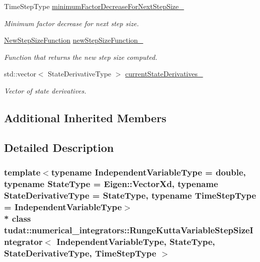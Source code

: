 \begin{DoxyCompactItemize}
Time\+Step\+Type \hyperlink{classtudat_1_1numerical__integrators_1_1RungeKuttaVariableStepSizeIntegrator_ae478abe53ab327c5a8e4f8ca978123f6}{minimum\+Factor\+Decrease\+For\+Next\+Step\+Size\+\_\+}
\begin{DoxyCompactList}\small\item\em Minimum factor decrease for next step size. \end{DoxyCompactList}\item 
\hyperlink{classtudat_1_1numerical__integrators_1_1RungeKuttaVariableStepSizeIntegrator_a7f439a647db26cafc16b08f5b2922868}{New\+Step\+Size\+Function} \hyperlink{classtudat_1_1numerical__integrators_1_1RungeKuttaVariableStepSizeIntegrator_ace984339dfb58e1ced57ab260d9992c2}{new\+Step\+Size\+Function\+\_\+}
\begin{DoxyCompactList}\small\item\em Function that returns the new step size computed. \end{DoxyCompactList}\item 
std\+::vector$<$ State\+Derivative\+Type $>$ \hyperlink{classtudat_1_1numerical__integrators_1_1RungeKuttaVariableStepSizeIntegrator_a3c76b8be3eea0bd6c4d31a8aae391030}{current\+State\+Derivatives\+\_\+}
\begin{DoxyCompactList}\small\item\em Vector of state derivatives. \end{DoxyCompactList}\end{DoxyCompactItemize}
\subsection*{Additional Inherited Members}


\subsection{Detailed Description}
\subsubsection*{template$<$typename Independent\+Variable\+Type = double, typename State\+Type = Eigen\+::\+Vector\+Xd, typename State\+Derivative\+Type = State\+Type, typename Time\+Step\+Type = Independent\+Variable\+Type$>$\\*
class tudat\+::numerical\+\_\+integrators\+::\+Runge\+Kutta\+Variable\+Step\+Size\+Integrator$<$ Independent\+Variable\+Type, State\+Type, State\+Derivative\+Type, Time\+Step\+Type $>$}

